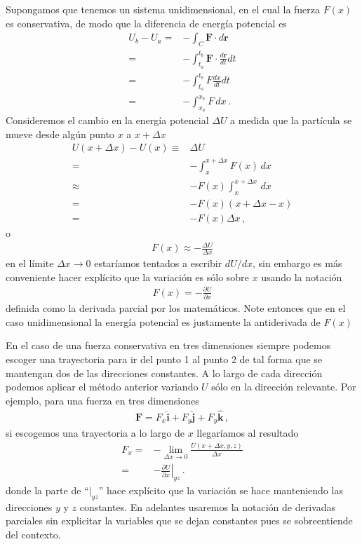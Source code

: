 Supongamos que tenemos un sistema unidimensional, en el cual la fuerza $F(x)$ es conservativa, de modo que la diferencia de energía potencial es
\begin{align}
  U_b-U_a=&-\int_C \mathbf{F}\cdot d\mathbf{r}\nonumber\\ 
  =&-\int_{t_a}^{t_b} \mathbf{F}\cdot \frac{d\mathbf{r}}{dt}dt\nonumber\\ 
  =&-\int_{t_a}^{t_b} F\frac{dx}{dt}dt\nonumber\\ 
  =&-\int_{x_a}^{x_b} F\,{dx}\,.
\end{align}
Consideremos el cambio en la energía potencial $\Delta U$ a medida que la partícula se mueve desde algún punto $x$ a $x+\Delta x$
\begin{align}
  U(x+\Delta x)-U(x)\equiv&\Delta U\nonumber\\
  =&-\int_x^{x+\Delta x}F(x)\,dx\nonumber\\
\approx &-F(x)\int_x^{x+\Delta x}\,dx\nonumber\\
=&-F(x)(x+\Delta x-x)\nonumber\\
=&-F(x)\Delta x\,,
\end{align}
o
\begin{align}
  F(x)\approx -\frac{\Delta U}{\Delta x}
\end{align}
en el límite $\Delta x\to 0$ estaríamos tentados a escribir $dU/dx$, sin embargo es más conveniente hacer explícito que la variación es sólo sobre $x$ usando la notación
\begin{align}
  F(x)= -\frac{\partial U}{\partial x}
\end{align}
definida como la derivada parcial por los matemáticos. Note entonces que en el caso unidimensional la energía potencial es justamente la antiderivada de $F(x)$

En el caso de una fuerza conservativa en tres dimensiones siempre podemos escoger una trayectoria para ir del punto 1 al punto 2 de tal forma que se mantengan dos de las direcciones constantes. A lo largo de cada dirección podemos aplicar el método anterior variando $U$ sólo en la dirección relevante. Por ejemplo,
para una fuerza en tres dimensiones
\begin{align}
  \mathbf{F}=F_x\hat{\mathbf{i}}+F_y\hat{\mathbf{j}}+F_y\hat{\mathbf{k}}\,,
\end{align}
si escogemos una trayectoria a lo largo de $x$ llegaríamos al resultado
\begin{align}
  F_x=&-\lim_{\Delta x\to 0} \frac{U(x+\Delta x,y,z)}{\Delta x}\nonumber\\
  =&-\left.\frac{\partial U}{\partial x}\right|_{yz}\,.
\end{align}
donde la parte de ``$|_{yz}$'' hace explícito que la variación se hace manteniendo las direcciones $y$ y $z$ constantes. En adelantes usaremos la notación de derivadas parciales sin explicitar la variables que se dejan constantes pues se sobreentiende del contexto.

